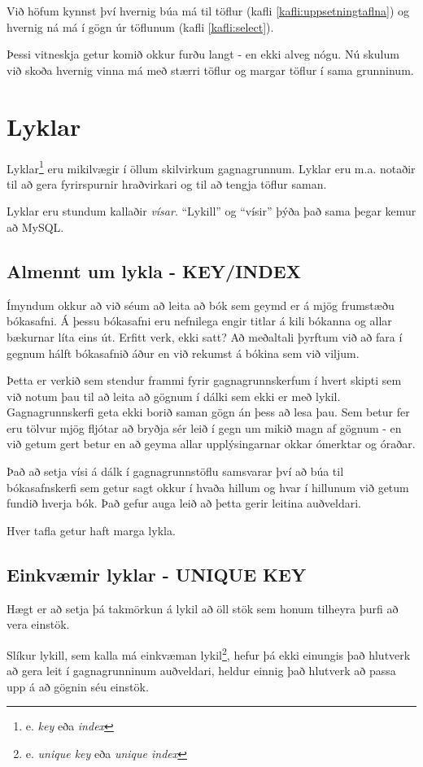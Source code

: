 Við höfum kynnst því hvernig búa má til töflur (kafli \ref{kafli:uppsetningtaflna}) og hvernig ná má í gögn úr töflunum (kafli \ref{kafli:select}). 

Þessi vitneskja getur komið okkur furðu langt - en ekki alveg nógu. Nú skulum við skoða hvernig vinna má með stærri töflur og margar töflur í sama grunninum.
\section{Lyklar}
\label{undirkafli:lyklar}
Lyklar\footnote{e. \emph{key} eða \emph{index}} eru mikilvægir í öllum skilvirkum gagnagrunnum. Lyklar eru m.a. notaðir til að gera fyrirspurnir hraðvirkari og til að tengja töflur saman.

Lyklar eru stundum kallaðir \emph{vísar}. ``Lykill'' og ``vísir'' þýða það sama þegar kemur að MySQL.
\subsection{Almennt um lykla - KEY/INDEX}
Ímyndum okkur að við séum að leita að bók sem geymd er á mjög frumstæðu bókasafni. Á þessu bókasafni eru nefnilega engir titlar á kili bókanna og allar bækurnar líta eins út.
Erfitt verk, ekki satt? Að meðaltali þyrftum við að fara í gegnum hálft bókasafnið áður en við rekumst á bókina sem við viljum.

Þetta er verkið sem stendur frammi fyrir gagnagrunnskerfum í hvert skipti sem við notum þau til að leita að gögnum í dálki sem ekki er með lykil.
Gagnagrunnskerfi geta ekki borið saman gögn án þess að lesa þau.
Sem betur fer eru tölvur mjög fljótar að bryðja sér leið í gegn um mikið magn af gögnum - en við getum gert betur en að geyma allar upplýsingarnar okkar ómerktar og óraðar.

Það að setja vísi á dálk í gagnagrunnstöflu samsvarar því að búa til bókasafnskerfi sem getur sagt okkur í hvaða hillum og hvar í hillunum við getum fundið hverja bók. Það gefur auga leið að þetta gerir leitina auðveldari.

Hver tafla getur haft marga lykla.
\subsection{Einkvæmir lyklar - UNIQUE KEY}
Hægt er að setja þá takmörkun á lykil að öll stök sem honum tilheyra þurfi að vera einstök.

Slíkur lykill, sem kalla má einkvæman lykil\footnote{e. \emph{unique key} eða \emph{unique index}}, hefur þá ekki einungis það hlutverk að gera leit í gagnagrunninum auðveldari, heldur einnig það hlutverk að passa upp á að gögnin séu einstök.

